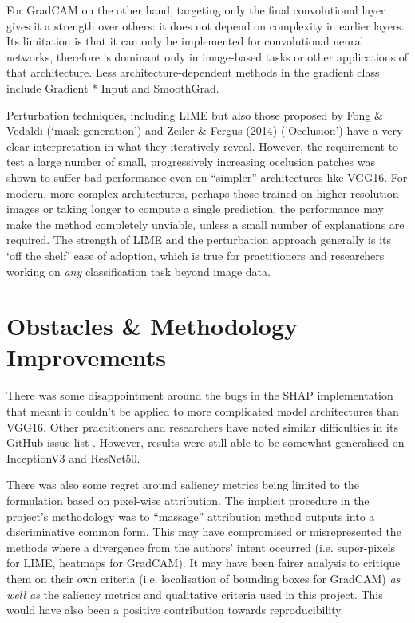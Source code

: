 \documentclass[main]{subfiles}
\begin{document}
For GradCAM on the other hand, targeting only the final convolutional layer gives it a strength over others: it does not depend on complexity in earlier layers. Its limitation is that it can only be implemented for convolutional neural networks, therefore is dominant only in image-based tasks or other applications of that architecture. Less architecture-dependent methods in the gradient class include Gradient * Input and SmoothGrad.

Perturbation techniques, including LIME but also those proposed by Fong \& Vedaldi \cite{perturb_fong} (`mask generation') and Zeiler \& Fergus (2014) \cite{zeilerfergus2013} ('Occlusion') have a very clear interpretation in what they iteratively reveal. However, the requirement to test a large number of small, progressively increasing occlusion patches was shown to suffer bad performance even on ``simpler'' architectures like VGG16. For modern, more complex architectures, perhaps those trained on higher resolution images or taking longer to compute a single prediction, the performance may make the method completely unviable, unless a  small number of explanations are required. The strength of LIME and the perturbation approach generally is its `off the shelf' ease of adoption, which is true for practitioners and researchers working on \textit{any} classification task beyond image data.

\section{Obstacles \& Methodology Improvements}

There was some disappointment around the bugs in the SHAP implementation that meant it couldn't be applied to more complicated model architectures than VGG16. Other practitioners and researchers have noted similar difficulties in its GitHub issue list \cite{shaprepo}. However, results were still able to be somewhat generalised on InceptionV3 and ResNet50.

There was also some regret around saliency metrics being limited to the formulation based on pixel-wise attribution. The implicit procedure in the project's methodology was to ``massage'' attribution method outputs into a discriminative common form. This may have compromised or misrepresented the methods where a divergence from the authors' intent occurred (i.e. super-pixels for LIME, heatmaps for GradCAM). It may have been fairer analysis to critique them on their own criteria (i.e. localisation of bounding boxes for GradCAM) \textit{as well as} the saliency metrics and qualitative criteria used in this project. This would have also been a positive contribution towards reproducibility.
\end{document}
